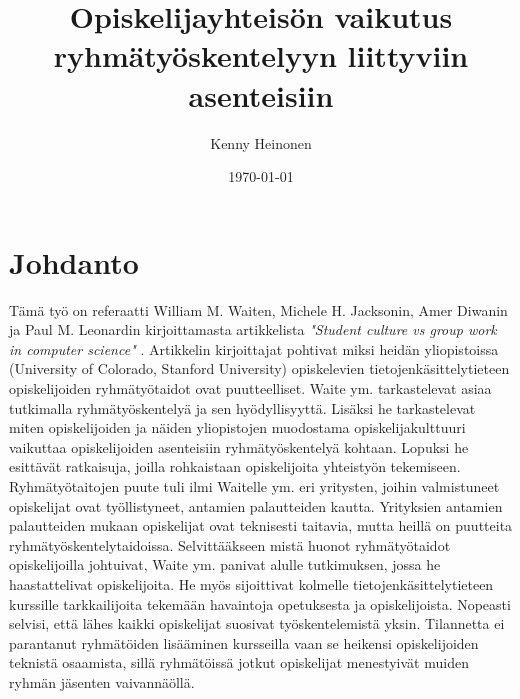 \documentclass[finnish]{../tktltiki2}
\title{Opiskelijayhteisön vaikutus ryhmätyöskentelyyn liittyviin asenteisiin}
\author{Kenny Heinonen}
\date{\today}
\theoremstyle{definition}
\theoremstyle{remark}
\begin{document}

\maketitle        %

\tableofcontents  %
\newpage          %



\section{Johdanto}



Tämä työ on referaatti William M. Waiten, Michele H. Jacksonin, Amer Diwanin ja Paul M. Leonardin kirjoittamasta artikkelista \emph{"Student culture vs group work in computer science"} \cite{Waite:2004:SCV:1028174.971308}.
Artikkelin kirjoittajat pohtivat miksi heidän yliopistoissa (University of Colorado, Stanford University) opiskelevien tietojenkäsittelytieteen opiskelijoiden ryhmätyötaidot ovat puutteelliset. Waite ym. tarkastelevat asiaa tutkimalla ryhmätyöskentelyä ja sen hyödyllisyyttä. Lisäksi he tarkastelevat miten opiskelijoiden ja näiden yliopistojen muodostama opiskelijakulttuuri vaikuttaa opiskelijoiden asenteisiin ryhmätyöskentelyä kohtaan. Lopuksi he esittävät ratkaisuja, joilla rohkaistaan opiskelijoita yhteistyön tekemiseen.\\

Ryhmätyötaitojen puute tuli ilmi Waitelle ym. eri yritysten, joihin valmistuneet opiskelijat ovat työllistyneet, antamien palautteiden kautta. Yrityksien antamien palautteiden mukaan opiskelijat ovat teknisesti taitavia, mutta heillä on puutteita ryhmätyöskentelytaidoissa. Selvittääkseen mistä huonot ryhmätyötaidot opiskelijoilla johtuivat, Waite ym. panivat alulle tutkimuksen, jossa he haastattelivat opiskelijoita. He myös sijoittivat kolmelle tietojenkäsittelytieteen kurssille tarkkailijoita tekemään havaintoja opetuksesta ja opiskelijoista. Nopeasti selvisi, että lähes kaikki opiskelijat suosivat työskentelemistä yksin. Tilannetta ei parantanut ryhmätöiden lisääminen kursseilla vaan se heikensi opiskelijoiden teknistä osaamista, sillä ryhmätöissä jotkut opiskelijat menestyivät muiden ryhmän jäsenten vaivannäöllä.
\end{document}
